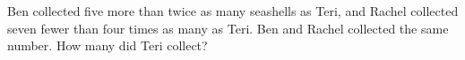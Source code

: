 Ben collected five more than twice as many seashells as Teri, and Rachel collected seven fewer than four times as many as Teri. Ben and Rachel collected the same number. How many did Teri collect?
